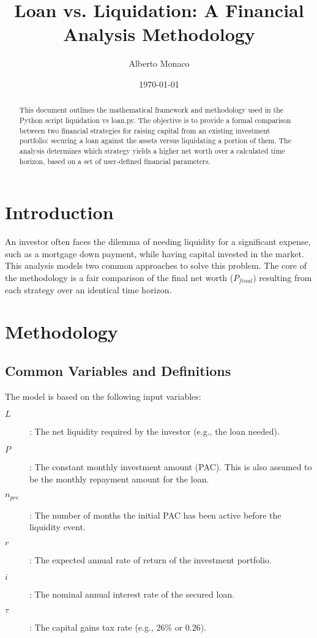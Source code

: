 \documentclass[a4paper, 11pt]{article}
\title{\textbf{Loan vs. Liquidation: A Financial Analysis Methodology}}
\author{Alberto Monaco}
\date{\today}
\begin{document}
	
	\maketitle
	
	\begin{abstract}
		This document outlines the mathematical framework and methodology used in the Python script liquidation vs loan.py. The objective is to provide a formal comparison between two financial strategies for raising capital from an existing investment portfolio: securing a loan against the assets versus liquidating a portion of them. The analysis determines which strategy yields a higher net worth over a calculated time horizon, based on a set of user-defined financial parameters.
	\end{abstract}
	
	\section{Introduction}
	An investor often faces the dilemma of needing liquidity for a significant expense, such as a mortgage down payment, while having capital invested in the market. This analysis models two common approaches to solve this problem. The core of the methodology is a fair comparison of the final net worth ($P_{final}$) resulting from each strategy over an identical time horizon.
	
	\section{Methodology}
	
	\subsection{Common Variables and Definitions}
	The model is based on the following input variables:
	\begin{description}
		\item[$L$]: The net liquidity required by the investor (e.g., the loan needed).
		\item[$P$]: The constant monthly investment amount (PAC). This is also assumed to be the monthly repayment amount for the loan.
		\item[$n_{pre}$]: The number of months the initial PAC has been active before the liquidity event.
		\item[$r$]: The expected annual rate of return of the investment portfolio.
		\item[$i$]: The nominal annual interest rate of the secured loan.
		\item[$\tau$]: The capital gains tax rate (e.g., 26\% or 0.26).
	\end{description}
	
\end{document}
